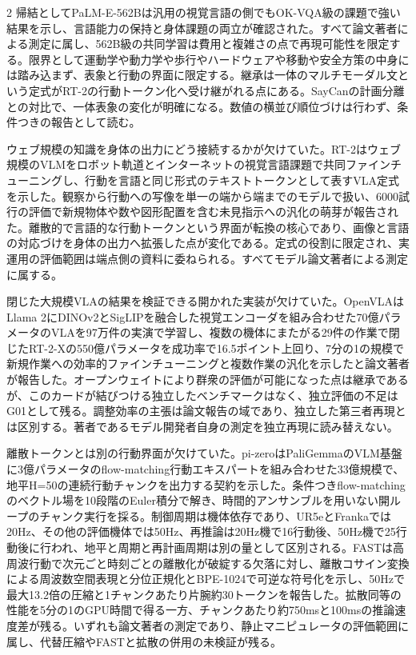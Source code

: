 \documentclass[lualatex,a4paper,10pt]{jlreq}
\begin{document}
\begin{multicols}{2}
\noindent 帰結としてPaLM-E-562Bは汎用の視覚言語の側でもOK-VQA級の課題で強い結果を示し、言語能力の保持と身体課題の両立が確認された。すべて論文著者による測定に属し、562B級の共同学習は費用と複雑さの点で再現可能性を限定する。限界として運動学や動力学や歩行やハードウェアや移動や安全方策の中身には踏み込まず、表象と行動の界面に限定する。継承は一体のマルチモーダル文という定式がRT-2の行動トークン化へ受け継がれる点にある。SayCanの計画分離との対比で、一体表象の変化が明確になる。数値の横並び順位づけは行わず、条件つきの報告として読む。\autocite{vmd095}\par\medskip
\noindent ウェブ規模の知識を身体の出力にどう接続するかが欠けていた。RT-2はウェブ規模のVLMをロボット軌道とインターネットの視覚言語課題で共同ファインチューニングし、行動を言語と同じ形式のテキストトークンとして表すVLA定式を示した。観察から行動への写像を単一の端から端までのモデルで扱い、6000試行の評価で新規物体や数や図形配置を含む未見指示への汎化の萌芽が報告された。離散的で言語的な行動トークンという界面が転換の核心であり、画像と言語の対応づけを身体の出力へ拡張した点が変化である。定式の役割に限定され、実運用の評価範囲は端点側の資料に委ねられる。すべてモデル論文著者による測定に属する。\autocite{vmd097}\par\medskip
\noindent 閉じた大規模VLAの結果を検証できる開かれた実装が欠けていた。OpenVLAはLlama 2にDINOv2とSigLIPを融合した視覚エンコーダを組み合わせた70億パラメータのVLAを97万件の実演で学習し、複数の機体にまたがる29件の作業で閉じたRT-2-Xの550億パラメータを成功率で16.5ポイント上回り、7分の1の規模で新規作業への効率的ファインチューニングと複数作業の汎化を示したと論文著者が報告した。オープンウェイトにより群衆の評価が可能になった点は継承であるが、このカードが結びつける独立したベンチマークはなく、独立評価の不足はG01として残る。調整効率の主張は論文報告の域であり、独立した第三者再現とは区別する。著者であるモデル開発者自身の測定を独立再現に読み替えない。\autocite{vmd098}\par\medskip
\noindent 離散トークンとは別の行動界面が欠けていた。pi-zeroはPaliGemmaのVLM基盤に3億パラメータのflow-matching行動エキスパートを組み合わせた33億規模で、地平H=50の連続行動チャンクを出力する契約を示した。条件つきflow-matchingのベクトル場を10段階のEuler積分で解き、時間的アンサンブルを用いない開ループのチャンク実行を採る。制御周期は機体依存であり、UR5eとFrankaでは20Hz、その他の評価機体では50Hz、再推論は20Hz機で16行動後、50Hz機で25行動後に行われ、地平と周期と再計画周期は別の量として区別される。FASTは高周波行動で次元ごと時刻ごとの離散化が破綻する欠落に対し、離散コサイン変換による周波数空間表現と分位正規化とBPE-1024で可逆な符号化を示し、50Hzで最大13.2倍の圧縮と1チャンクあたり片腕約30トークンを報告した。拡散同等の性能を5分の1のGPU時間で得る一方、チャンクあたり約750msと100msの推論速度差が残る。いずれも論文著者の測定であり、静止マニピュレータの評価範囲に属し、代替圧縮やFASTと拡散の併用の未検証が残る。\autocite{vmd116,vmd117}\par\medskip

\end{multicols}
\end{document}
